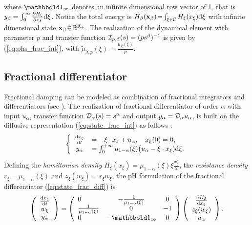 \documentclass[10pt,a4paper]{article}
\begin{document}
where $\ones_\infty$ denotes an infinite dimensional row vector of 1, that is $y_\beta = \int_0^{\infty }\frac{\partial H_\xi}{\partial x_\xi} \mathrm{d} \xi$.
%
Notice the total energy is $H_\beta(\mathbf{x}_\beta)\!=\!\int_{\xi\in\mathcal{C}} H_\xi(x_\xi)  \mathrm{d} \xi$ with infinite dimensional state $\bf x_\beta\!\in\!\mathbb{R}^{\mathbb{R_+}}$. 
The realization of the dynamical element with parameter $p$ and transfer function ${\mathcal{I}}_{p,\beta}(s) = (p s^\beta)^{-1}$ is given by (\ref{eq:phs_frac_int}), with $\tilde \mu_{\beta,p}(\xi)= \frac{ \mu_\beta(\xi)}{p}$.
%
%
%
%
%
%
%
%
%
%
%
%
%
%
%
%
%
%
%
%
%
%
\subsection{Fractional differentiator}
\label{sec:frac_diff}
Fractional damping can be modeled as combination of fractional integrators and differentiators (see \cite{koeller1984applications,helie2006diffusive,sabatier2007advances,le2012diffusive}).
%
The realization of fractional differentiator of order $\alpha$ with input $u_\alpha$, transfer function ${\mathcal{D}}_\alpha(s)=s^{\alpha}$ and output $y_\alpha={\mathcal{D}}_\alpha u_\alpha$, is built on the diffusive representation (\ref{eq:state_frac_int}) as follows \cite{helie2006diffusive, le2012diffusive}:
%
\begin{equation}
\label{eq:state_frac_diff}
\left\{ \begin{array}{cl}
\frac{\mathrm{d} x_\xi}{ \mathrm{d} t} &=  -\xi\cdot x_\xi  + u_\alpha,\quad x_\xi(0)=0,\\
y_\alpha&= \int_0^{+\infty} \mu_{1-\alpha}(\xi)\big(u_\alpha-\xi\cdot x_\xi)\mathrm{d} \xi .
\end{array} \right.
\end{equation}
%
Defining the \emph{hamiltonian density }$H_\xi(x_\xi) = \mu_{1-\alpha}(\xi) \xi \frac{x_\xi^2}{2} $, the \emph{resistance density }$r_\xi = \mu_{1-\alpha}(\xi)$ and $z_\xi( w_\xi)=r_\xi w_\xi$, the pH formulation of the fractional differentiator (\ref{eq:state_frac_diff}) is 
\begin{equation}
\label{eq:phs_frac_diff}
\left(\begin{array}{c}
\frac{\d x_\xi}{ \d t} \\
w_\xi \\
y_\alpha
\end{array}\right)
=
\left(\begin{array}{lcc}
0 & - \frac{1}{\mu_{1-\alpha}(\xi)} & 0\\
 \frac{1}{\mu_{1-\alpha}(\xi)} & 0 & -1\\
0 & -\ones_\infty & 0
\end{array}\right)
\left(\begin{array}{c}
\frac{\partial H_\xi}{\d x_\xi}\\
z_\xi( w_\xi) \\
u_\alpha
\end{array}\right).
\end{equation}
% 
%
%
%
%
%
%
%
%
%
%
%
%
%
%
%
%
%
%
%
%
%
%
\end{document}
